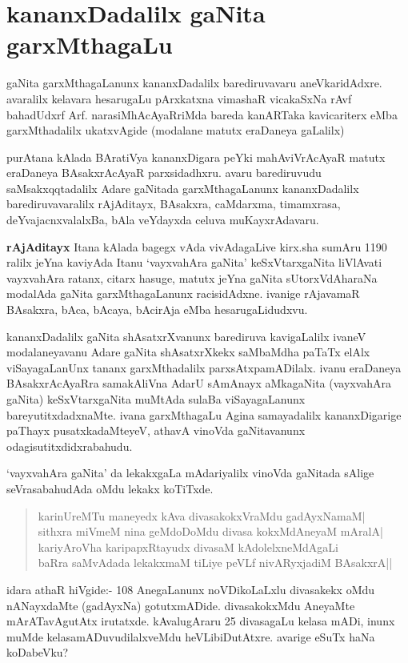 \chapter{kananxDadalilx gaNita garxMthagaLu}

\vskip -20pt
gaNita garxMthagaLanunx kananxDadalilx barediruvavaru aneVkaridAdxre. avaralilx kelavara hesaru\-gaLu pArxkatxna vimashaR vicakaSxNa rAvf bahadUdxrf Arf. narasiMhAcAyaRriMda bareda kanARTaka kavicariterx eMba garxMthadalilx ukatxvAgide (modalane matutx eraDaneya  gaLalilx)

purAtana kAlada BAratiVya kananxDigara peYki mahAviVrAcAyaR matutx eraDaneya BAsakxrAcAyaR parxsidadhxru. avaru barediruvudu saMsakxqqtadalilx Adare gaNitada garxMthagaLanunx kananxDadalilx barediruvavaralilx rAjAditayx, BAsakxra, caMdarxma, timamxrasa, deYvajacnxvalalxBa, bAla veYdayxda celuva muKayxrAdavaru.

\textbf{rAjAditayx} Itana kAlada bagegx vAda vivAdagaLive kirx.sha sumAru {\rm 1190} ralilx jeYna kaviyAda Itanu `vayxvahAra gaNita' keSxVtarxgaNita liVlAvati vayxvahAra ratanx, citarx hasuge, matutx jeYna gaNita sUtorxVdAharaNa modalAda gaNita garxMthagaLanunx racisidAdxne. ivanige rAjavamaR BAsakxra, bAca, bAcaya, bAcirAja eMba hesarugaLidudxvu.

kananxDadalilx gaNita shAsatxrXvanunx barediruva kavigaLalilx ivaneV modalaneyavanu Adare gaNita shAsatxrXkekx saMbaMdha paTaTx elAlx viSayagaLanUnx tananx garxMthadalilx parxsAtxpamADilalx. ivanu eraDaneya BAsakxrAcAyaRra samakAliVna AdarU sAmAnayx aMkagaNita (vayxvahAra gaNita) keSxVtarxgaNita muMtAda sulaBa viSayagaLanunx bareyutitxdadxnaMte. ivana garxMthagaLu Agina samayadalilx kananxDigarige paThayx pusatxkadaMteyeV, athavA vinoVda gaNitavanunx odagisutitxdidxrabahudu.

`vayxvahAra gaNita' da lekakxgaLa mAdariyalilx vinoVda gaNitada sAlige seVrasa\-bahudAda oMdu lekakx koTiTxde.
\begin{verse}
karinUreMTu maneyedx kAva divasakokxVraMdu gadAyxNamaM|\\
sithxra miVmeM nina geMdoDoMdu divasa kokxMdAneyaM mAralA|\\
kariyAroVha karipapxRtayudx divasaM kAdolelxneMdAgaLi\\
baRra saMvAdada lekakxmaM tiLiye peVLf nivARyxjadiM BAsakxrA||
\end{verse}

idara athaR hiVgide:- {\rm 108} AnegaLanunx noVDikoLaLxlu divasakekx oMdu nANayxdaMte (gadAyxNa) gotutxmADide. divasakokxMdu AneyaMte mArATa\-vAgutAtx irutatxde. kAvalugAraru {\rm 25} divasagaLu kelasa mADi, inunx muMde kelasa\break mADuvudilalxveMdu heVLibiDutAtxre. avarige eSuTx haNa koDabeVku?

